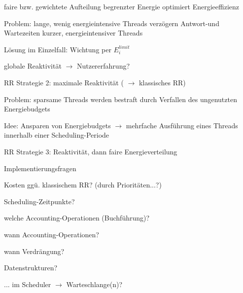 \documentclass[a4paper]{article}
\begin{document}
\begin{multicols}{3}
\begin{itemize*}
        \item faire bzw. gewichtete Aufteilung begrenzter Energie optimiert Energieeffizienz
        \item Problem: lange, wenig energieintensive Threads verzögern Antwort-und Wartezeiten kurzer, energieintensiver Threads
        \begin{itemize*}
            \item Lösung im Einzelfall: Wichtung per $E_i^{limit}$
            \item globale Reaktivität $\rightarrow$ Nutzererfahrung?
        \end{itemize*}
        \item RR Strategie 2: maximale Reaktivität ( $\rightarrow$ klassisches RR)
        \item Problem: sparsame Threads werden bestraft durch Verfallen des ungenutzten Energiebudgets
        \item Idee: Ansparen von Energiebudgets $\rightarrow$ mehrfache Ausführung eines Threads innerhalb einer Scheduling-Periode
        \item RR Strategie 3: Reaktivität, dann faire Energieverteilung
    \end{itemize*}
    Implementierungsfragen
    \begin{itemize*}
        \item Kosten ggü. klassischem RR? (durch Prioritäten...?)
        \item Scheduling-Zeitpunkte?
        \begin{itemize*}
            \item welche Accounting-Operationen (Buchführung)?
            \item wann Accounting-Operationen?
            \item wann Verdrängung?
        \end{itemize*}
        \item Datenstrukturen?
        \begin{itemize*}
            \item ... im Scheduler $\rightarrow$ Warteschlange(n)?

\end{itemize*}
\end{itemize*}
\end{multicols}
\end{document}
